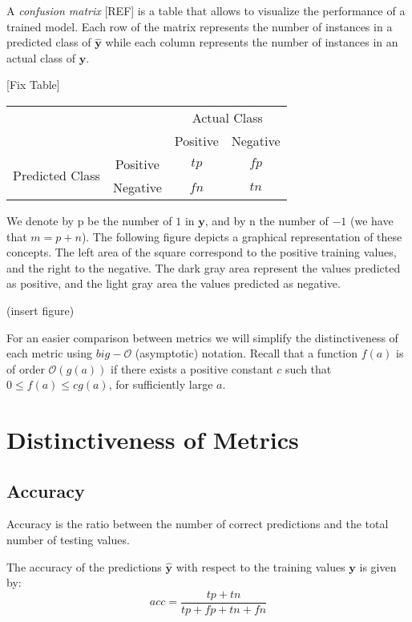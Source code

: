 A \emph{confusion matrix} [REF] is a table that allows to visualize the performance of a trained model. Each row of the matrix represents the number of instances in a predicted class of $\hat{\mathbf{y}}$ while each column represents the number of instances in an actual class of $\mathbf{y}$.

[Fix Table]

\begin{center}
\begin{tabular}{|c|c|c|c|}
\hline 
\multicolumn{1}{|c}{\multirow{2}{*}{}} &  & \multicolumn{2}{c|}{Actual Class}\tabularnewline
\cline{3-4} 
 &  & Positive & Negative\tabularnewline
\hline 
\multirow{2}{*}{Predicted Class} & Positive & $tp$ & $fp$\tabularnewline
\cline{2-4} 
 & Negative & $fn$ & $tn$\tabularnewline
\hline 
\end{tabular}
\par\end{center}

We denote by p be the number of $1$ in $\mathbf{y}$, and by n the number of $-1$ (we have that $m=p+n$). The following figure depicts a graphical representation of these concepts. The left area of the square correspond to the positive training values, and the right to the negative. The dark gray area represent the values predicted as positive, and the light gray area the values predicted as negative.

(insert figure)

For an easier comparison between metrics we will simplify the distinctiveness of each metric using $big-\mathcal{O}$ (asymptotic) notation. Recall that a function $f\left(a\right)$ is of order $\mathcal{O}\left(g\left(a\right)\right)$ if there exists a positive constant $c$ such that $0 \leq f\left(a\right)\leq cg\left(a\right)$, for sufficiently large $a$.

\section{Distinctiveness of Metrics}

\subsection{Accuracy}

Accuracy is the ratio between the number of correct predictions and the total number of testing values.

\begin{definition}
The accuracy of the predictions $\hat{\mathbf{y}}$ with respect to the training values $\mathbf{y}$ is given by:
\[
acc = \frac{tp+tn}{tp+fp+tn+fn}
\]
\end{definition}

